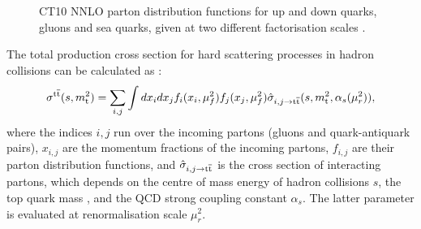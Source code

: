 \begin{figure}[!hbtp]
   \centering
   \caption[CT10 NNLO parton distribution functions.]{CT10 NNLO parton distribution functions for up and down quarks,
   gluons and sea quarks, given at two different factorisation scales \autocite{CT10_NNLO}.}
   \label{fig:CT10_PDFs}
\end{figure}


The total \ttbar production cross section for hard scattering processes in hadron collisions can be calculated as
\autocite{Sterman1986}:
\begin{equation}
\sigma^{\mathrm{t}\overline{\mathrm{t}}} (s,m_\mathrm{t}^2) = \sum_{i,j} \int dx_i dx_j f_i(x_i, \mu_f^2) f_j(x_j,\mu_f^2) \hat{\sigma}_{i,j
\rightarrow \mathrm{t}\overline{\mathrm{t}}} (s, m_\mathrm{t}^2, \alpha_s(\mu_r^2)),
\end{equation}
where the indices $i,j$ run over the incoming partons (gluons and quark-antiquark pairs), $x_{i,j}$ are the momentum
fractions of the incoming partons, $f_{i,j}$ are their parton distribution functions, and $\hat{\sigma}_{i,j
\rightarrow \mathrm{t}\overline{\mathrm{t}}}$ is the cross section of interacting partons, which depends on the centre of mass energy of hadron
collisions $s$, the top quark mass \mtop, and the QCD strong coupling constant $\alpha_s$. The latter parameter is
evaluated at renormalisation scale $\mu_r^2$. %

